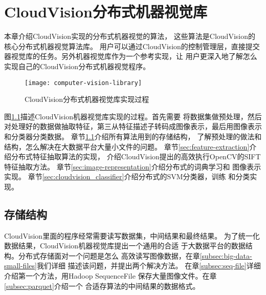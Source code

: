 \chapter{CloudVision分布式机器视觉库}
\label{cha:distributed_vision_library}
本章介绍CloudVision实现的分布式机器视觉的算法，
这些算法是CloudVision的核心分布式机器视觉算法库。
用户可以通过CloudVision的控制管理层，直接提交
器视觉库的任务。另外机器视觉库作为一个参考实现，让
用户更深入地了解怎么实现自己的CloudVision分布式机器视觉程序。

\begin{figure}[h]
  \centering
    \texttt{[image: computer-vision-library]}
  \caption{CloudVision分布式机器视觉库实现过程}
  \label{fig:computer-vision-library}
\end{figure}
图\ref{fig:computer-vision-library}描述CloudVision机器视觉库实现的过程。首先需要
将数据集做预处理，然后对处理好的数据做抽取特征，第三从特征描述子转码成图像表示，最后用图像表示
和分类器分类数据。
章节\ref{sec:storage_format}介绍所有算法用到的存储结构，
了解预处理的做法和结构，怎么解决在大数据平台大量小文件的问题。
章节\ref{sec:feature-extraction}介绍分布式特征抽取算法的实现，
介绍CloudVision提出的高效执行OpenCV的SIFT特征抽取方法。
章节\ref{sec:image-representation}介绍分布式的词典学习和
图像表示实现。
章节\ref{sec:cloudvision_classifier}介绍分布式的SVM分类器，训练
和分类实现。


\section{存储结构}
\label{sec:storage_format}
CloudVision里面的程序经常需要读写数据集，中间结果和最终结果。
为了统一化数据结果，CloudVision机器视觉库提出一个通用的合适
于大数据平台的数据结构。分布式存储面对一个问题是怎么
高效读写图像数据，在章\ref{subsec:big-data-small-files}我们详细
描述该问题，并提出两个解决方法。
在章\ref{subsec:seq-file}详细介绍第一个方法，用Hadoop SequenceFile
保存大量图像文件。在章\ref{subsec:parquet}介绍一个
合适存算法的中间结果的数据格式。


